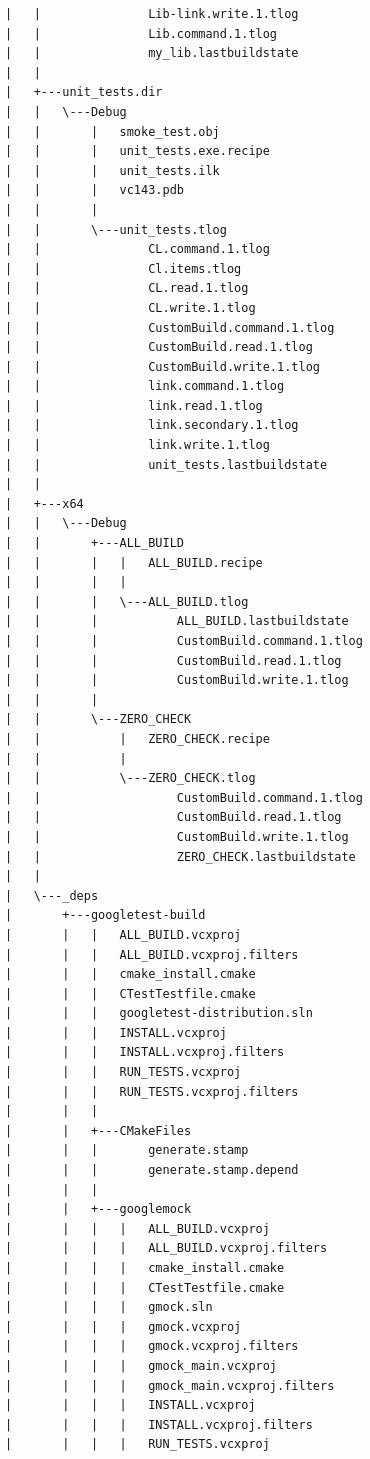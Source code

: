 \documentclass[a4paper,12pt]{article}
\begin{document}
\begin{verbatim}
|   |               Lib-link.write.1.tlog
|   |               Lib.command.1.tlog
|   |               my_lib.lastbuildstate
|   |               
|   +---unit_tests.dir
|   |   \---Debug
|   |       |   smoke_test.obj
|   |       |   unit_tests.exe.recipe
|   |       |   unit_tests.ilk
|   |       |   vc143.pdb
|   |       |   
|   |       \---unit_tests.tlog
|   |               CL.command.1.tlog
|   |               Cl.items.tlog
|   |               CL.read.1.tlog
|   |               CL.write.1.tlog
|   |               CustomBuild.command.1.tlog
|   |               CustomBuild.read.1.tlog
|   |               CustomBuild.write.1.tlog
|   |               link.command.1.tlog
|   |               link.read.1.tlog
|   |               link.secondary.1.tlog
|   |               link.write.1.tlog
|   |               unit_tests.lastbuildstate
|   |               
|   +---x64
|   |   \---Debug
|   |       +---ALL_BUILD
|   |       |   |   ALL_BUILD.recipe
|   |       |   |   
|   |       |   \---ALL_BUILD.tlog
|   |       |           ALL_BUILD.lastbuildstate
|   |       |           CustomBuild.command.1.tlog
|   |       |           CustomBuild.read.1.tlog
|   |       |           CustomBuild.write.1.tlog
|   |       |           
|   |       \---ZERO_CHECK
|   |           |   ZERO_CHECK.recipe
|   |           |   
|   |           \---ZERO_CHECK.tlog
|   |                   CustomBuild.command.1.tlog
|   |                   CustomBuild.read.1.tlog
|   |                   CustomBuild.write.1.tlog
|   |                   ZERO_CHECK.lastbuildstate
|   |                   
|   \---_deps
|       +---googletest-build
|       |   |   ALL_BUILD.vcxproj
|       |   |   ALL_BUILD.vcxproj.filters
|       |   |   cmake_install.cmake
|       |   |   CTestTestfile.cmake
|       |   |   googletest-distribution.sln
|       |   |   INSTALL.vcxproj
|       |   |   INSTALL.vcxproj.filters
|       |   |   RUN_TESTS.vcxproj
|       |   |   RUN_TESTS.vcxproj.filters
|       |   |   
|       |   +---CMakeFiles
|       |   |       generate.stamp
|       |   |       generate.stamp.depend
|       |   |       
|       |   +---googlemock
|       |   |   |   ALL_BUILD.vcxproj
|       |   |   |   ALL_BUILD.vcxproj.filters
|       |   |   |   cmake_install.cmake
|       |   |   |   CTestTestfile.cmake
|       |   |   |   gmock.sln
|       |   |   |   gmock.vcxproj
|       |   |   |   gmock.vcxproj.filters
|       |   |   |   gmock_main.vcxproj
|       |   |   |   gmock_main.vcxproj.filters
|       |   |   |   INSTALL.vcxproj
|       |   |   |   INSTALL.vcxproj.filters
|       |   |   |   RUN_TESTS.vcxproj

\end{verbatim}
\end{document}

